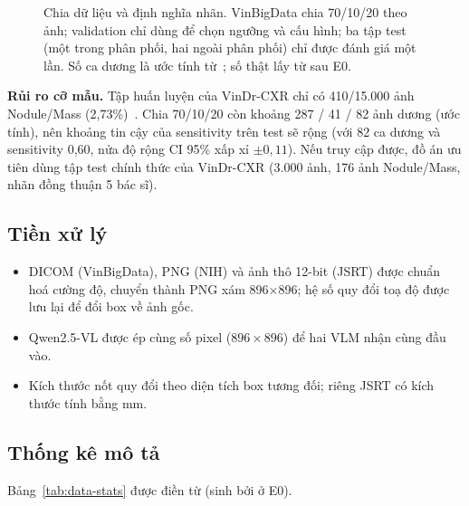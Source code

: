 \begin{figure}[H]
\caption{Chia dữ liệu và định nghĩa nhãn. VinBigData chia 70/10/20 theo ảnh; validation chỉ dùng để chọn ngưỡng
và cấu hình; ba tập test (một trong phân phối, hai ngoài phân phối) chỉ được đánh giá một lần. Số ca dương là ước
tính từ~\cite{nguyen2022vindr}; số thật lấy từ  sau E0.}
\label{fig:split}
\end{figure}

\begin{warnbox}
\textbf{Rủi ro cỡ mẫu.} Tập huấn luyện của VinDr-CXR chỉ có 410/15.000 ảnh Nodule/Mass
(2,73\%)~\cite{nguyen2022vindr}. Chia 70/10/20 còn khoảng 287 / 41 / 82 ảnh dương (ước tính), nên khoảng tin cậy
của sensitivity trên test sẽ rộng (với 82 ca dương và sensitivity 0,60, nửa độ rộng CI 95\% xấp xỉ $\pm 0{,}11$).
Nếu truy cập được, đồ án ưu tiên dùng tập test chính thức của VinDr-CXR (3.000 ảnh, 176 ảnh Nodule/Mass, nhãn
đồng thuận 5 bác sĩ).
\end{warnbox}

\subsection{Tiền xử lý}

\begin{itemize}
  \item DICOM (VinBigData), PNG (NIH) và ảnh thô 12-bit (JSRT) được chuẩn hoá cường độ, chuyển thành PNG xám
        896$\times$896; hệ số quy đổi toạ độ được lưu lại để đổi box về ảnh gốc.
  \item Qwen2.5-VL được ép cùng số pixel ($896 \times 896$) để hai VLM nhận cùng đầu vào.
  \item Kích thước nốt quy đổi theo diện tích box tương đối; riêng JSRT có kích thước tính bằng mm.
\end{itemize}

\subsection{Thống kê mô tả}

Bảng~\ref{tab:data-stats} được điền từ  (sinh bởi  ở E0).

